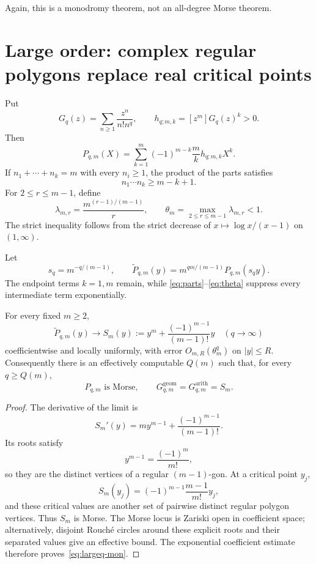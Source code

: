Again, this is a monodromy theorem, not an all-degree Morse theorem.

\section{Large order: complex regular polygons replace real critical points}

Put
\[
G_q(z)=\sum_{n\ge1}\frac{z^n}{n!n^q},
\qquad
h_{q;m,k}=[z^m]G_q(z)^k>0.
\]
Then
\begin{equation}
P_{q,m}(X)
=\sum_{k=1}^m(-1)^{m-k}\frac{m}{k}h_{q;m,k}X^k.
\label{eq:P-positive}
\end{equation}
If $n_1+\cdots+n_k=m$ with every $n_i\ge1$, the product of the parts
satisfies
\begin{equation}
n_1\cdots n_k\ge m-k+1.
\label{eq:parts}
\end{equation}
For $2\le r\le m-1$, define
\begin{equation}
\lambda_{m,r}=\frac{m^{(r-1)/(m-1)}}r,
\qquad
\theta_m=\max_{2\le r\le m-1}\lambda_{m,r}<1.
\label{eq:theta}
\end{equation}
The strict inequality follows from the strict decrease of
$x\mapsto\log x/(x-1)$ on $(1,\infty)$.

Let
\[
s_q=m^{-q/(m-1)},
\qquad
\widetilde P_{q,m}(y)
=m^{qm/(m-1)}P_{q,m}(s_qy).
\]
The endpoint terms $k=1,m$ remain, while
\eqref{eq:parts}--\eqref{eq:theta} suppress every intermediate term
exponentially.

\begin{theorem}\label{thm:largeq}
For every fixed $m\ge2$,
\begin{equation}
\boxed{
\widetilde P_{q,m}(y)
\longrightarrow
S_m(y):=y^m+\frac{(-1)^{m-1}}{(m-1)!}y
\quad(q\to\infty)}
\label{eq:limit}
\end{equation}
coefficientwise and locally uniformly, with error
$O_{m,R}(\theta_m^q)$ on $|y|\le R$. Consequently there is an effectively
computable $Q(m)$ such that, for every $q\ge Q(m)$,
\begin{equation}
\boxed{
P_{q,m}\text{ is Morse},
\qquad
G^{\mathrm{geom}}_{q,m}=G^{\mathrm{arith}}_{q,m}=S_m.}
\label{eq:largeq-mon}
\end{equation}
\end{theorem}

\begin{proof}
The derivative of the limit is
\[
S_m'(y)=my^{m-1}+\frac{(-1)^{m-1}}{(m-1)!}.
\]
Its roots satisfy
\[
y^{m-1}=\frac{(-1)^m}{m!},
\]
so they are the distinct vertices of a regular $(m-1)$-gon. At a critical
point $y_j$,
\[
S_m(y_j)=(-1)^{m-1}\frac{m-1}{m!}y_j,
\]
and these critical values are another set of pairwise distinct regular
polygon vertices. Thus $S_m$ is Morse. The Morse locus is Zariski open in
coefficient space; alternatively, disjoint Rouch\'e circles around these
explicit roots and their separated values give an effective bound. The
exponential coefficient estimate therefore proves~\eqref{eq:largeq-mon}.
\end{proof}

